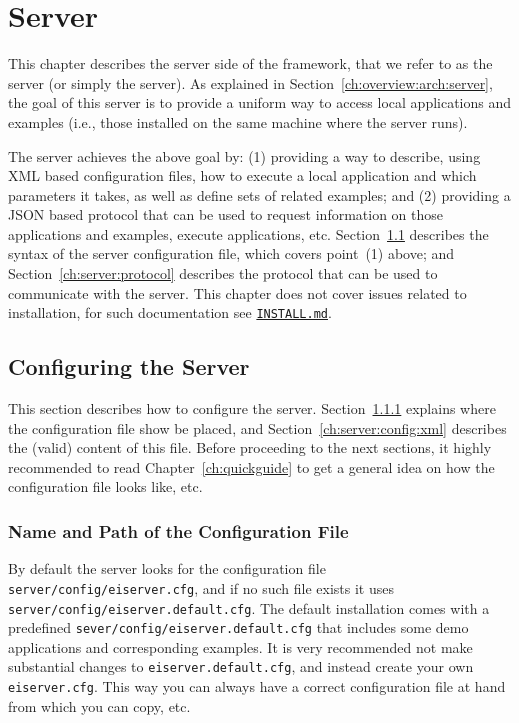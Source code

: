 {%
}
\chapter{\ei Server}
\label{ch:server}

This chapter describes the server side of the \ei framework, that we
refer to as the \ei server (or simply the server).
%
As explained in Section~\ref{ch:overview:arch:server}, the goal of
this server is to provide a uniform way to access local applications
and examples (i.e., those installed on the same machine where the
server runs).


The \ei server achieves the above goal by:
%
(1) providing a way to describe, using XML based configuration files,
how to execute a local application and which parameters it takes, as
well as define sets of related examples; and
%
(2) providing a JSON based protocol that can be used to request
information on those applications and examples, execute applications,
etc.
%
Section~\ref{ch:server:config} describes the syntax of the server
configuration file, which covers point~(1) above; and
Section~\ref{ch:server:protocol} describes the protocol that can be
used to communicate with the server.
%
This chapter does not cover issues related to installation, for such
documentation see
\texttt{\href{http://github.com/abstools/easyinterface}{INSTALL.md}}.


\section{Configuring the \ei Server}
\label{ch:server:config}

This section describes how to configure the \ei server.
%
Section~\ref{ch:server:config:file} explains where the configuration
file show be placed, and Section~\ref{ch:server:config:xml} describes
the (valid) content of this file.
%
Before proceeding to the next sections, it highly recommended to read
Chapter~\ref{ch:quickguide} to get a general idea on how the
configuration file looks like, etc.


\subsection{Name and Path of the Configuration File}
\label{ch:server:config:file}

By default the server looks for the configuration file
\texttt{server/config/eiserver.cfg}, and if no such file exists it
uses \texttt{server/config/eiserver.default.cfg}.
%
The default installation comes with a predefined
\texttt{sever/config/eiserver.default.cfg} that includes some demo
applications and corresponding examples. It is very recommended not
make substantial changes to \texttt{eiserver.default.cfg}, and instead
create your own \texttt{eiserver.cfg}. This way you can always have a
correct configuration file at hand from which you can copy, etc.


